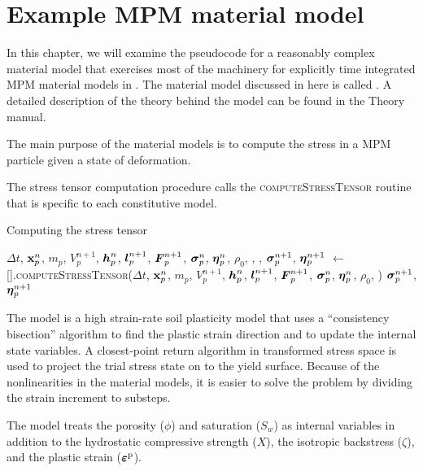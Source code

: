 \chapter{Example MPM material model}

In this chapter, we will examine the pseudocode for a reasonably complex material model
that exercises most of the machinery for explicitly time integrated MPM
material models in \Vaango.  The material model discussed in here is called \Arena.  A detailed
description of the theory behind the model can be found in the \Vaango Theory manual.

The main purpose of the material models is to compute the stress in a MPM particle given a state
of deformation.

The stress tensor computation procedure calls the \textsc{computeStressTensor} routine that is
specific to each constitutive model.
\begin{breakablealgorithm}
  \caption{Computing the stress tensor}
  \begin{algorithmic}[1]
    \Require $\Delta t$, $\mathbf{x}_p^n$, $m_p$, $V_p^{n+1}$, $\boldsymbol{h}_p^n$, $\boldsymbol{l}_p^{n+1}$, $\boldsymbol{F}_p^{n+1}$,
             $\boldsymbol{\sigma}_p^n$, $\boldsymbol{\eta}_p^n$, $\rho_0$, , , 
        \State $\boldsymbol{\sigma}_p^{n+1}$, $\boldsymbol{\eta}_p^{n+1}$ $\leftarrow$
          [\TTmatl].\textsc{computeStressTensor}($\Delta t$, $\mathbf{x}_p^n$, 
             $m_p$, $V_p^{n+1}$, $\boldsymbol{h}_p^n$, \WRP
             $\boldsymbol{l}_p^{n+1}$, $\boldsymbol{F}_p^{n+1}$, $\boldsymbol{\sigma}_p^n$, $\boldsymbol{\eta}_p^n$, $\rho_0$, 
             )
      \EndFor
      \State \Return $\boldsymbol{\sigma}_p^{n+1}$, $\boldsymbol{\eta}_p^{n+1}$
    \EndProcedure
  \end{algorithmic}
\end{breakablealgorithm}

The \Arena model is a high strain-rate soil plasticity model that uses a
``consistency bisection'' algorithm to find the plastic strain direction and to 
update the internal state variables.  A closest-point return algorithm in transformed 
stress space is used to project the trial stress state on to the yield surface. 
Because of the nonlinearities in the material models, it is easier to solve the problem by 
dividing the strain increment to substeps.

The \Arena model treats the porosity ($\phi$) and saturation ($S_w$) as internal 
variables in addition to the hydrostatic compressive strength ($X$), the isotropic 
backstress ($\zeta$), and the plastic strain ($\boldsymbol{\varepsilon}^{\text{p}}$).

